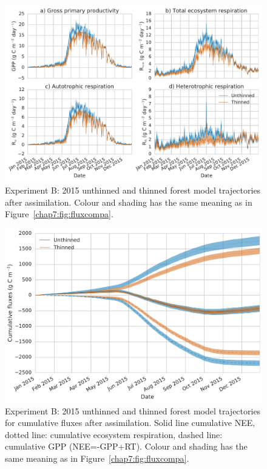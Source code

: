  
 \begin{figure}
 \noindent\includegraphics[width=30pc]{chapter/chapter7/flux_compb.pdf}
\caption{Experiment B: 2015 unthinned and thinned forest model trajectories after assimilation. Colour and shading has the same meaning as in Figure~\ref{chap7:fig:fluxcompa}.}
 \label{chap7:fig:fluxcompb}
 \end{figure}
 
  \begin{figure}
 \noindent\includegraphics[width=30pc]{chapter/chapter7/cum_fluxb.pdf}
\caption{Experiment B: 2015 unthinned and thinned forest model trajectories for cumulative fluxes after assimilation. Solid line cumulative NEE, dotted line: cumulative ecosystem respiration, dashed line: cumulative GPP (NEE=-GPP+RT). Colour and shading has the same meaning as in Figure~\ref{chap7:fig:fluxcompa}.}
 \label{chap7:fig:fluxcumb}
 \end{figure}
 
